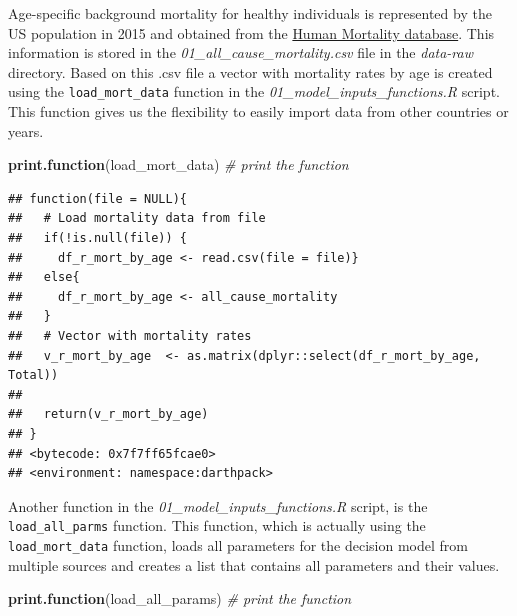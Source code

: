 \documentclass[]{book}
\newenvironment{Shaded}{\begin{snugshade}}{\end{snugshade}}
\newcommand{\KeywordTok}[1]{\textcolor[rgb]{0.13,0.29,0.53}{\textbf{#1}}}
\newcommand{\CommentTok}[1]{\textcolor[rgb]{0.56,0.35,0.01}{\textit{#1}}}
\newcommand{\NormalTok}[1]{#1}
\begin{document}
Age-specific background mortality for healthy individuals is represented
by the US population in 2015 and obtained from the
\href{https://www.mortality.org}{Human Mortality database}. This
information is stored in the \emph{01\_all\_cause\_mortality.csv} file
in the \emph{data-raw} directory. Based on this .csv file a vector with
mortality rates by age is created using the \texttt{load\_mort\_data}
function in the \emph{01\_model\_inputs\_functions.R} script. This
function gives us the flexibility to easily import data from other
countries or years.

\begin{Shaded}
\begin{Highlighting}[]
\KeywordTok{print.function}\NormalTok{(load_mort_data) }\CommentTok{# print the function}
\end{Highlighting}
\end{Shaded}

\begin{verbatim}
## function(file = NULL){
##   # Load mortality data from file
##   if(!is.null(file)) {
##     df_r_mort_by_age <- read.csv(file = file)}
##   else{
##     df_r_mort_by_age <- all_cause_mortality
##   }
##   # Vector with mortality rates
##   v_r_mort_by_age  <- as.matrix(dplyr::select(df_r_mort_by_age, Total))
##   
##   return(v_r_mort_by_age)
## }
## <bytecode: 0x7f7ff65fcae0>
## <environment: namespace:darthpack>
\end{verbatim}

Another function in the \emph{01\_model\_inputs\_functions.R} script, is
the \texttt{load\_all\_parms} function. This function, which is actually
using the \texttt{load\_mort\_data} function, loads all parameters for
the decision model from multiple sources and creates a list that
contains all parameters and their values.

\begin{Shaded}
\begin{Highlighting}[]
\KeywordTok{print.function}\NormalTok{(load_all_params)  }\CommentTok{# print the function}
\end{Highlighting}
\end{Shaded}
\end{document}
